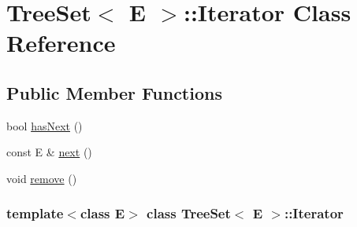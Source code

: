 \hypertarget{class_tree_set_1_1_iterator}{
\section{TreeSet$<$ E $>$::Iterator Class Reference}
\label{class_tree_set_1_1_iterator}
}
\subsection*{Public Member Functions}
\begin{DoxyCompactItemize}
\item 
bool \hyperlink{class_tree_set_1_1_iterator_a81a946570bf039668a3f4f17d8bdb522}{hasNext} ()
\item 
const E \& \hyperlink{class_tree_set_1_1_iterator_adaa874f4e96a7e6d5cf35bb4ad6db32e}{next} ()
\item 
void \hyperlink{class_tree_set_1_1_iterator_a4e00a24727da13641c8ee6cd69e67411}{remove} ()
\end{DoxyCompactItemize}
\subsubsection*{template$<$class E$>$ class TreeSet$<$ E $>$::Iterator}



